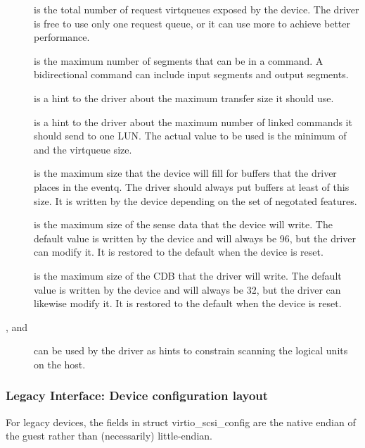 \begin{description}
\item[] is the total number of request virtqueues exposed by
    the device. The driver is free to use only one request queue,
    or it can use more to achieve better performance.

\item[] is the maximum number of segments that can be in a
    command. A bidirectional command can include  input
    segments and  output segments.

\item[] is a hint to the driver about the maximum transfer
    size it should use.

\item[] is a hint to the driver about the maximum number of
    linked commands it should send to one LUN. The actual value
    to be used is the minimum of  and the virtqueue
    size.

\item[] is the maximum size that the device will fill
    for buffers that the driver places in the eventq. The driver
    should always put buffers at least of this size. It is
    written by the device depending on the set of negotated
    features.

\item[] is the maximum size of the sense data that the
    device will write. The default value is written by the device
    and will always be 96, but the driver can modify it. It is
    restored to the default when the device is reset.

\item[] is the maximum size of the CDB that the driver will
    write. The default value is written by the device and will
    always be 32, but the driver can likewise modify it. It is
    restored to the default when the device is reset.

\item[,  and ] can be used by the driver
    as hints to constrain scanning the logical units on the
    host.
\end{description}

\subsubsection{Legacy Interface: Device configuration layout}\label{sec:Device Types / SCSI Host Device / Device configuration layout / Legacy Interface: Device configuration layout}
For legacy devices, the fields in struct virtio_scsi_config are the
native endian of the guest rather than (necessarily) little-endian.

